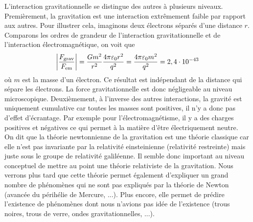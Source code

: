 \documentclass[a4paper,11pt]{report}
\theoremstyle{definition}
\theoremstyle{plain}
\theoremstyle{definition}
\theoremstyle{remark}
\begin{document}
        L'interaction gravitationnelle se distingue des autres à plusieurs niveaux. Premièrement, la gravitation est une interaction extrêmement faible par rapport aux autres. Pour illustrer cela, imaginons deux électrons séparés d'une distance $r$. Comparons les ordres de grandeur de l'interaction gravitationnelle et de l'interaction électromagnétique, on voit que
        \begin{equation}
            \abs{\frac{F_{\text{grav}}}{F_{\text{em}}}} = \frac{Gm^2}{r^2}\frac{4\pi\varepsilon_0r^2}{q^2} = \frac{4\pi\varepsilon_0 m^2}{q^2} = 2,4\cdot10^{-43}
        \end{equation}
        où $m$ est la masse d'un électron. Ce résultat est indépendant de la distance qui sépare les électrons. La force gravitationnelle est donc négligeable au niveau microscopique. Deuxièmement, à l'inverse des autres interactions, la gravité est uniquement cumulative car toutes les masses sont positives, il n'y a donc pas d'effet d'écrantage. Par exemple pour l'électromagnétisme, il y a des charges positives et négatives ce qui permet à la matière d'être électriquement neutre.\\
        
        On dit que la théorie newtonnienne de la gravitation est une théorie classique car elle n'est pas invariante par la relativité einsteinienne (relativité restreinte) mais juste sous le groupe de relativité galiléenne. Il semble donc important au niveau conceptuel de mettre au point une théorie relativiste de la gravitation. Nous verrons plus tard que cette théorie permet également d'expliquer un grand nombre de phénomènes qui ne sont pas expliqués par la théorie de Newton (avancée du périhélie de Mercure, ...). Plus encore, elle permet de prédire l'existence de phénomènes dont nous n'avions pas idée de l'existence (trous noires, trous de verre, ondes gravitationnelles, ...).\\
        
\end{document}
